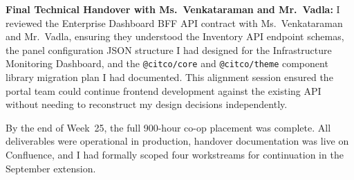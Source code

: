 \textbf{Final Technical Handover with Ms.\ Venkataraman and Mr.\ Vadla:} 
I reviewed the Enterprise Dashboard BFF API contract with Ms.\ Venkataraman and Mr.\ Vadla, ensuring they understood the Inventory API endpoint schemas, the panel configuration JSON structure I had designed for the Infrastructure Monitoring Dashboard, and the \texttt{@citco/core} and \texttt{@citco/theme} component library migration plan I had documented. This alignment session ensured the portal team could continue frontend development against the existing API without needing to reconstruct my design decisions independently.

By the end of Week~25, the full 900-hour co-op placement was complete. All deliverables were operational in production, handover documentation was live on Confluence, and I had formally scoped four workstreams for continuation in the September extension.

\FloatBarrier
